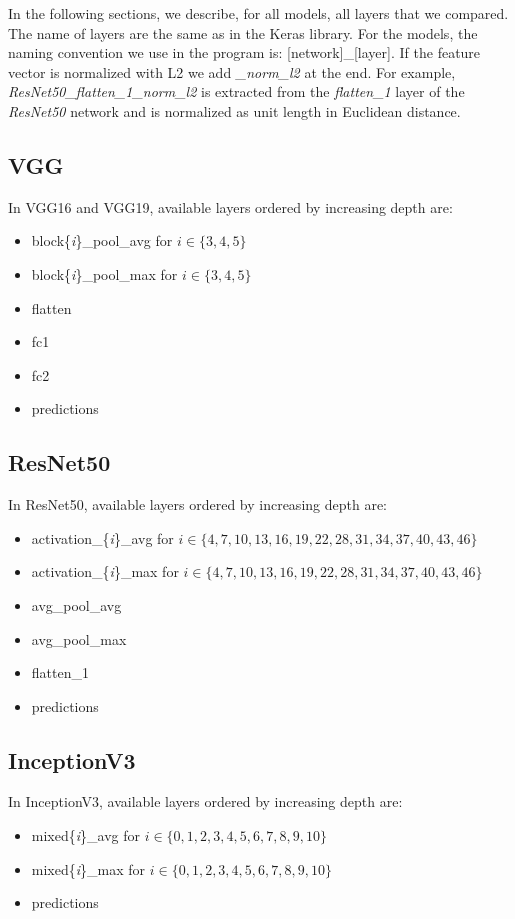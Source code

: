 In the following sections, we describe, for all models, all layers that we compared. The name of layers are the same as in the Keras library. For the models, the naming convention we use in the program is: [network]\_[layer]. If the feature vector is normalized with L2 we add \textit{\_norm\_l2} at the end. For example, \textit{ResNet50\_flatten\_1\_norm\_l2} is extracted from the \textit{flatten\_1} layer of the \textit{ResNet50} network and is normalized as unit length in Euclidean distance.

\subsection{VGG}
In VGG16 and VGG19, available layers ordered by increasing depth are:
\begin{itemize}
	\item block\{\textit{i}\}\_pool\_avg for $i \in \{3, 4, 5\}$
	\item block\{\textit{i}\}\_pool\_max for $i \in \{3, 4, 5\}$
	\item flatten
	\item fc1
	\item fc2
	\item predictions
\end{itemize}

\subsection{ResNet50}
In ResNet50, available layers ordered by increasing depth are:
\begin{itemize}
	\item activation\_\{\textit{i}\}\_avg for $i \in \{4, 7, 10, 13, 16, 19, 22, 28, 31, 34, 37, 40, 43, 46\}$
	\item activation\_\{\textit{i}\}\_max for $i \in \{4, 7, 10, 13, 16, 19, 22, 28, 31, 34, 37, 40, 43, 46\}$
	\item avg\_pool\_avg
	\item avg\_pool\_max
	\item flatten\_1
	\item predictions
\end{itemize}

\subsection{InceptionV3}
In InceptionV3, available layers ordered by increasing depth are:
\begin{itemize}
	\item mixed\{\textit{i}\}\_avg for $i \in \{0, 1, 2, 3, 4, 5, 6, 7, 8, 9, 10\}$
	\item mixed\{\textit{i}\}\_max for $i \in \{0, 1, 2, 3, 4, 5, 6, 7, 8, 9, 10\}$
	\item predictions
\end{itemize}

